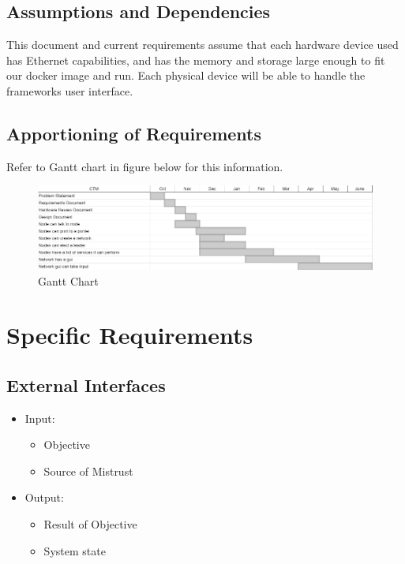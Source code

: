 \documentclass[draftclsnofoot, onecolumn, compsoc, 10pt]{IEEEtran}
\begin{document}
\subsection{Assumptions and Dependencies}
This document and current requirements assume that each hardware device used has Ethernet capabilities, and has the memory and storage large enough to fit our docker image and run. Each physical device will be able to handle the frameworks user interface.

\subsection{Apportioning of Requirements}
Refer to Gantt chart in figure below for this information.
\begin{landscape}
	\begin{figure}[!htb]
		\caption{Gantt Chart}
		\centering
			\includegraphics[scale=.7]{chart}
	\end{figure}
\end{landscape}
\FloatBarrier

\section{Specific Requirements}
\subsection{External Interfaces}
\begin{itemize}
\item Input:
	\begin{itemize}
	\item Objective 
    \item Source of Mistrust
	\end{itemize}
\item Output:
	\begin{itemize}
	\item Result of Objective
    \item System state
	\end{itemize}
\end{itemize}
\end{document}
